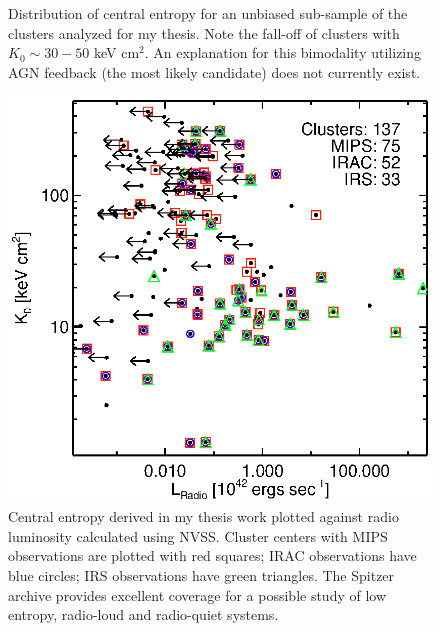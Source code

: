 \documentclass[11pt]{article}
\begin{document}
\begin{figure}[t]
\begin{minipage}[t]{0.5\linewidth}
        \caption{\small Distribution of central entropy for an
	unbiased sub-sample of the clusters analyzed for my thesis. Note the
	fall-off of clusters with $K_0 \sim 30-50$ keV
	cm$^2$. An explanation for this bimodality utilizing AGN
	feedback (the most likely candidate) does not currently
	exist.}
	\label{fig:k0hist}
    \end{minipage}
    \hspace{0.1cm}
    \begin{minipage}[t]{0.5\linewidth}
        \centering
        \includegraphics*[width=\textwidth, trim=28mm 8mm 30mm 10mm, clip]{spitzer_radk0}
        \caption{\small Central entropy derived in my thesis work
	plotted against radio luminosity calculated using
	NVSS. Cluster centers with MIPS observations are plotted with
	red squares; IRAC observations have blue circles; IRS observations
	have green triangles. The Spitzer archive provides excellent
	coverage for a possible study of low entropy, radio-loud and
	radio-quiet systems.}
        \label{fig:radk0}
    \end{minipage}
\end{figure}
\end{document}
